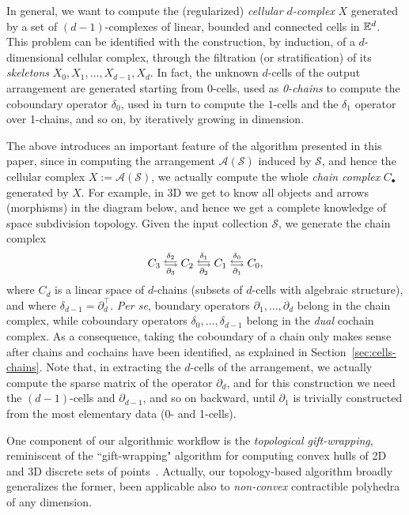 In general, we want to compute the (regularized) \emph{cellular $d$-complex} $X$ generated by a set of 
$(d-1)$-complexes of linear, bounded and connected cells {in $\mathbb{E}^d$}. 
This problem can be identified with the construction,
by induction, of a $d$-dimensional cellular complex, through the
filtration (or stratification) of its \emph{skeletons}
$X_0, X_1, \ldots, X_{d-1}, X_d$. In fact, the unknown $d$-cells of the
output arrangement are generated starting from $0$-cells, used as \emph{0-chains} to compute the coboundary operator $\delta_0$, used in turn to
compute the $1$-cells and the $\delta_1$ operator over 1-chains, and so on, by
iteratively growing in dimension.


The above introduces an important {feature} of the algorithm presented in this paper, since in computing the arrangement $\mathcal{A}(\mathcal{S})$ induced by $\mathcal{S}$, and hence the cellular complex $X := \mathcal{A}(\mathcal{S})$, we actually compute the whole \emph{chain complex} $C_\bullet$ generated by $X$. For example, in 3D we get to know all objects and arrows (morphisms) in the diagram below, and hence we get a complete knowledge of space subdivision topology.
Given the input collection $\mathcal{S}$, we generate the chain complex
\[
C_3 \mathrel{\substack{\delta_2\\\myrightleftarrows\\\partial_3}}  
C_2 \mathrel{\substack{\delta_1\\\myrightleftarrows\\\partial_2}}  
C_1 \mathrel{\substack{\delta_0\\\myrightleftarrows\\\partial_1}}  
C_0,
\]
where $C_d$ is a linear space of $d$-chains (subsets  of $d$-cells with algebraic structure), and where $\delta_{d-1} = \partial_d^\top$. 
\emph{Per se}, boundary operators $\partial_1,\dots,\partial_d$ belong in the chain complex, while coboundary operators $\delta_0,\dots,\delta_{d-1}$ belong in the \emph{dual} cochain complex. As a consequence, taking the coboundary of a chain only makes sense after chains and cochains have been identified, as explained in Section~\ref{sec:cells-chains}. 
Note that, in extracting the $d$-cells of the arrangement, we actually compute the sparse matrix of the operator $\partial_d$, and for this construction we need the $(d-1)$-cells and $\partial_{d-1}$, and so on backward, until $\partial_1$ is trivially constructed from the most elementary data (0- and 1-cells). 

{One component of our algorithmic workflow is the \emph{topological gift-wrapping}, reminiscent of the ``gift-wrapping" algorithm for computing convex hulls of 2D and 3D discrete sets of points~\cite{Jarvis:1973:ICH,Cormen:2009:IAT:1614191}. Actually, our topology-based algorithm broadly generalizes the former, been applicable also to \emph{non-convex}  contractible polyhedra of any dimension. }


